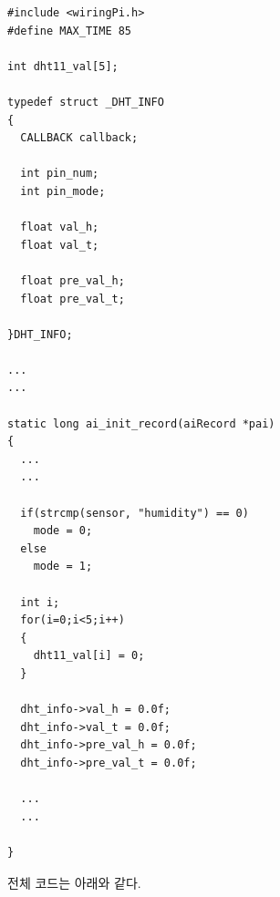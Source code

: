 \documentclass[11pt
  , a4paper
  , article
  , oneside
]{memoir}
\begin{document}
\begin{lstlisting}[style=termstylenumber, caption={Editing \texttt{/etc/fai/NFSROOT}}, label={list:nfsroot-file}]
#include <wiringPi.h>
#define MAX_TIME 85

int dht11_val[5];

typedef struct _DHT_INFO
{
  CALLBACK callback;

  int pin_num;
  int pin_mode;

  float val_h;
  float val_t;

  float pre_val_h;
  float pre_val_t;

}DHT_INFO;

...
...

static long ai_init_record(aiRecord *pai)
{
  ...
  ...

  if(strcmp(sensor, "humidity") == 0)
    mode = 0;
  else
    mode = 1;

  int i;
  for(i=0;i<5;i++)
  {
    dht11_val[i] = 0;
  }
  
  dht_info->val_h = 0.0f;
  dht_info->val_t = 0.0f;
  dht_info->pre_val_h = 0.0f;
  dht_info->pre_val_t = 0.0f;

  ...
  ...

}
\end{lstlisting}
전체 코드는 아래와 같다.
\end{document}
